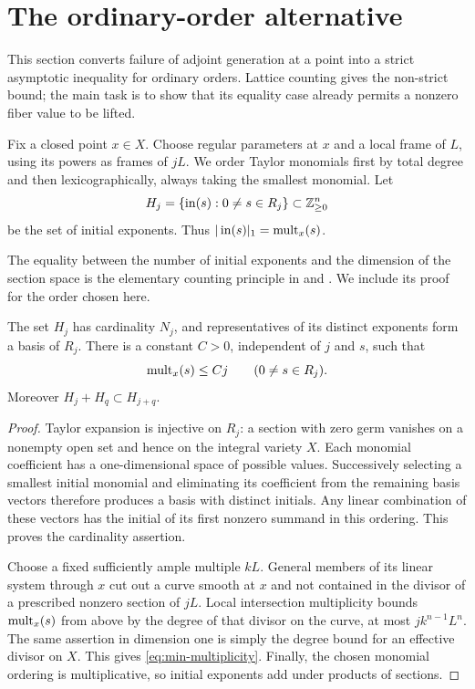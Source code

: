 \section{The ordinary-order alternative}
\label{sec:min-ordinary}

This section converts failure of adjoint generation at a point into a
strict asymptotic inequality for ordinary orders. Lattice counting gives
the non-strict bound; the main task is to show that its equality case
already permits a nonzero fiber value to be lifted.

Fix a closed point $x\in X$. Choose regular parameters at $x$ and a
local frame of $L$, using its powers as frames of $jL$. We order Taylor
monomials first by total degree and then lexicographically, always taking
the smallest monomial. Let
\[
 H_j=\{\operatorname{in}(s):0\ne s\in R_j\}
       \subset\mathbb Z_{\geq0}^n
\]
be the set of initial exponents. Thus
$|\operatorname{in}(s)|_1=\operatorname{mult}_x(s)$.

The equality between the number of initial exponents and the dimension
of the section space is the elementary counting principle in
\cite[Lemma~1.4]{lazarsfeldmustata2009} and
\cite[Proposition~2.6]{kavehkhovanskii2012}.
We include its proof for the order chosen here.

\begin{lemma}
\label{lem:min-initials}
The set $H_j$ has cardinality $N_j$, and representatives of its distinct
exponents form a basis of $R_j$. There is a constant $C>0$, independent
of $j$ and $s$, such that
\begin{equation}
\label{eq:min-multiplicity}
 \operatorname{mult}_x(s)\leq Cj\qquad(0\ne s\in R_j).
\end{equation}
Moreover $H_j+H_q\subset H_{j+q}$.
\end{lemma}

\begin{proof}
Taylor expansion is injective on $R_j$: a section with zero germ vanishes
on a nonempty open set and hence on the integral variety $X$. Each
monomial coefficient has a one-dimensional space of possible values.
Successively selecting a smallest initial monomial and eliminating its
coefficient from the remaining basis vectors therefore produces a basis
with distinct initials. Any linear combination of these vectors has the
initial of its first nonzero summand in this ordering. This proves the
cardinality assertion.

Choose a fixed sufficiently ample multiple $kL$. General members of its
linear system through $x$ cut out a curve smooth at $x$ and not contained
in the divisor of a prescribed nonzero section of $jL$. Local
intersection multiplicity bounds $\operatorname{mult}_x(s)$ from above by the degree
of that divisor on the curve, at most $jk^{n-1}L^n$. The same assertion
in dimension one is simply the degree bound for an effective divisor
on $X$. This gives \eqref{eq:min-multiplicity}. Finally, the chosen
monomial ordering is multiplicative, so initial exponents add under
products of sections.
\end{proof}


